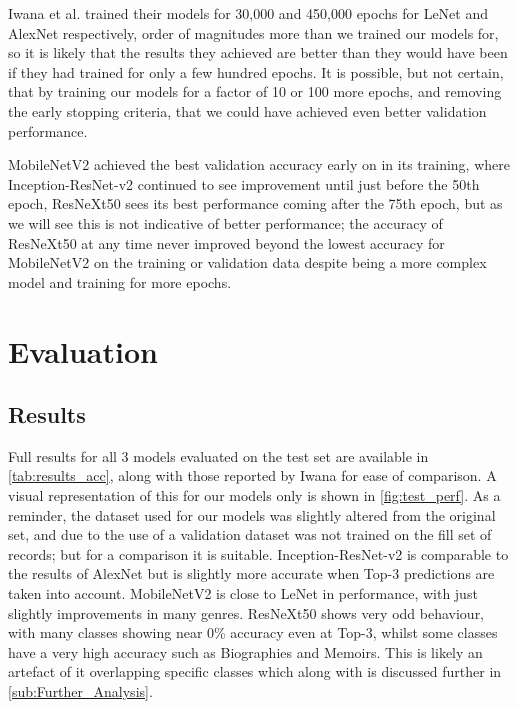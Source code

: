 \documentclass[12pt]{article}
\numberwithin{equation}{section}
\numberwithin{figure}{section}
\begin{document}
Iwana et al. trained their models for 30,000 and 450,000 epochs for LeNet and AlexNet respectively, order of magnitudes more than we trained our models for, so it is likely that the results they achieved are better than they would have been if they had trained for only a few hundred epochs. It is possible, but not certain, that by training our models for a factor of 10 or 100 more epochs, and removing the early stopping criteria, that we could have achieved even better validation performance. 

MobileNetV2 achieved the best validation accuracy early on in its training, where Inception-ResNet-v2 continued to see improvement until just before the 50th epoch, ResNeXt50 sees its best performance coming after the 75th epoch, but as we will see this is not indicative of better performance; the accuracy of ResNeXt50 at any time never improved beyond the lowest accuracy for MobileNetV2 on the training or validation data despite being a more complex model and training for more epochs.


\section{Evaluation} 
\label{sec:Evaluation_and_Further_Exploration} 
\subsection{Results} 
\label{sub:Results} 
Full results for all 3 models evaluated on the test set are available in \cref{tab:results_acc}, along with those reported by Iwana for ease of comparison. A visual representation of this for our models only is shown in \cref{fig:test_perf}. As a reminder, the dataset used for our models was slightly altered from the original set, and due to the use of a validation dataset was not trained on the fill set of records; but for a comparison it is suitable. Inception-ResNet-v2 is comparable to the results of AlexNet but is slightly more accurate when Top-3 predictions are taken into account. MobileNetV2 is close to LeNet in performance, with just slightly improvements in many genres. ResNeXt50 shows very odd behaviour, with many classes showing near 0\% accuracy even at Top-3, whilst some classes have a very high accuracy such as Biographies and Memoirs. This is likely an artefact of it overlapping specific classes which along with is discussed further in \cref{sub:Further_Analysis}.
\end{document}
